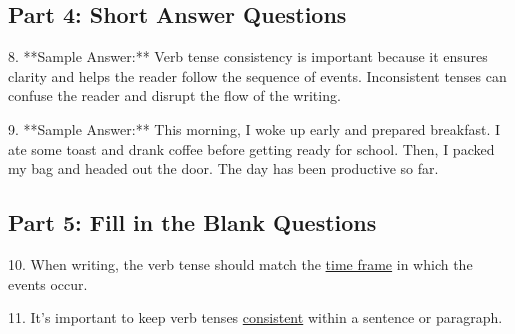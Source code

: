 \documentclass[12pt]{article}
\begin{document}
\subsection*{Part 4: Short Answer Questions}

8. **Sample Answer:** Verb tense consistency is important because it ensures clarity and helps the reader follow the sequence of events. Inconsistent tenses can confuse the reader and disrupt the flow of the writing.

9. **Sample Answer:** This morning, I woke up early and prepared breakfast. I ate some toast and drank coffee before getting ready for school. Then, I packed my bag and headed out the door. The day has been productive so far.

\subsection*{Part 5: Fill in the Blank Questions}

10. When writing, the verb tense should match the \underline{time frame} in which the events occur.

11. It's important to keep verb tenses \underline{consistent} within a sentence or paragraph.
\end{document}
